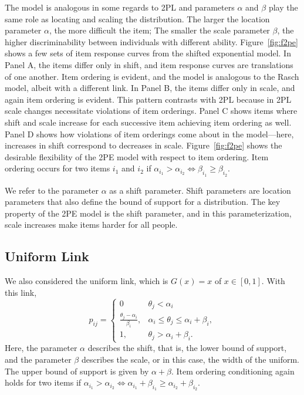 \documentclass[english,,man]{apa6}
\begin{document}
The model is analogous in some regards to 2PL and parameters \(\alpha\) and \(\beta\) play the same role as locating and scaling the distribution. The larger the location parameter \(\alpha\), the more difficult the item; The smaller the scale parameter \(\beta\), the higher discriminability between individuals with different ability. Figure~\ref{fig:f2pe} shows a few sets of item response curves from the shifted exponential model. In Panel A, the items differ only in shift, and item response curves are translations of one another. Item ordering is evident, and the model is analogous to the Rasch model, albeit with a different link. In Panel B, the items differ only in scale, and again item ordering is evident. This pattern contrasts with 2PL because in 2PL scale changes necessitate violations of item orderings. Panel C shows items where shift and scale increase for each successive item achieving item ordering as well. Panel D shows how violations of item orderings come about in the model---here, increases in shift correspond to decreases in scale. Figure~\ref{fig:f2pe} shows the desirable flexibility of the 2PE model with respect to item ordering. Item ordering occurs for two items \(i_1\) and \(i_2\) if \(\alpha_{i_1} > \alpha_{i_2} \iff \beta_{i_1} \geq \beta_{i_2}\).

We refer to the parameter \(\alpha\) as a shift parameter. Shift parameters are location parameters that also define the bound of support for a distribution. The key property of the 2PE model is the shift parameter, and in this parameterization, scale increases make items harder for all people.

\hypertarget{uniform-link}{%
\subsection{Uniform Link}\label{uniform-link}}

We also considered the uniform link, which is \(G(x)=x\) of \(x\in[0,1]\). With this link,
\[
p_{ij} = \left\{\begin{array}{cc}
0 & \theta_j<\alpha_i\\
\frac{\theta_j-\alpha_i}{\beta_i}, & \alpha_i \leq \theta_j \leq \alpha_i+\beta_i,\\
1, & \theta_j > \alpha_i+\beta_i .
\end{array}\right.
\]
Here, the parameter \(\alpha\) describes the shift, that is, the lower bound of support, and the parameter \(\beta\) describes the scale, or in this case, the width of the uniform. The upper bound of support is given by \(\alpha+\beta\). Item ordering conditioning again holds for two items if \(\alpha_{i_1} > \alpha_{i_2} \iff \alpha_{i_1} + \beta_{i_1} \geq \alpha_{i_2}+\beta_{i_2}\).
\end{document}
